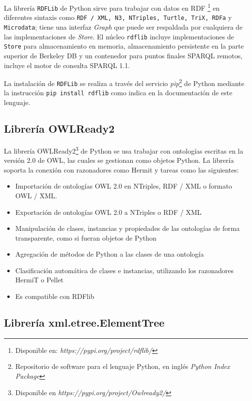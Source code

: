 La librer\'ia \texttt{RDFLib} de Python sirve para trabajar con datos en RDF \footnote{Disponible en: \textit{https://pypi.org/project/rdflib/}} en diferentes sintaxis como \texttt{RDF / XML, N3, NTriples, Turtle, TriX, RDFa} y \texttt{Microdata}; tiene una interfaz \textit{Graph} que puede ser respaldada por cualquiera de las implementaciones de \textit{Store}. El n\'ucleo \texttt{rdflib} incluye implementaciones de \texttt{Store} para almacenamiento en memoria, almacenamiento persistente en la parte superior de Berkeley DB y un contenedor para puntos finales SPARQL remotos, incluye el motor de consulta SPARQL 1.1.

La instalaci\'on de \texttt{RDFLib} se realiza a trav\'es del servicio \textit{pip}\footnote{Repositorio de software para el lenguaje Python, en ingl\'es \textit{Python Index Package} } de Python mediante la instrucci\'on \texttt{pip install rdflib} como indica en la documentaci\'on de este lenguaje. 

\subsection{Librer\'ia OWLReady2}

La librer\'ia OWLReady2\footnote{Disponible en \emph{https://pypi.org/project/Owlready2/}}  de Python se usa trabajar con ontolog\'ias escritas en la versi\'on 2.0 de OWL, las cuales se gestionan como objetos Python. La librer\'ia soporta la conexi\'on con razonadores como Hermit y tareas como las siguientes: 

\begin{itemize}
    \item Importaci\'on de ontolog\'ias OWL 2.0 en NTriples, RDF / XML o formato OWL / XML.
    \item Exportaci\'on de ontolog\'ias OWL 2.0 a NTriples o RDF / XML
    \item Manipulaci\'on de clases, instancias y propiedades de las ontolog\'ias de forma transparente, como si fueran objetos de Python
    \item Agregaci\'on de m\'etodos de Python a las clases de una ontolog\'ia
    \item Clasificaci\'on autom\'atica de clases e instancias, utilizando los razonadores HermiT o Pellet 
    \item Es compatible con RDFlib 
  \end{itemize}

\subsection{Librer\'ia xml.etree.ElementTree}

